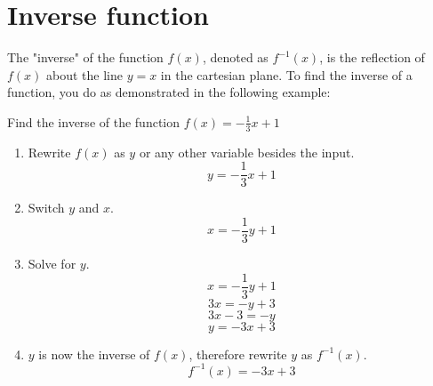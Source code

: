 \documentclass{article}
\begin{document}
\section{Inverse function}
The "inverse" of the function $f(x)$, denoted as $f^{-1}(x)$, is the reflection of $f(x)$ about the line $y=x$ in the cartesian plane. To find the inverse of a function, you do as demonstrated in the following example:

\begin{center}
    Find the inverse of the function $f(x)=-\frac{1}{3}x+1$
\end{center}

\begin{enumerate}
    \item Rewrite $f(x)$ as $y$ or any other variable besides the input.
    $$y=-\frac{1}{3}x+1$$
    \item Switch $y$ and $x$.
    $$x=-\frac{1}{3}y+1$$
    \item Solve for $y$.
    $$x=-\frac{1}{3}y+1$$
    $$3x=-y+3$$
    $$3x-3=-y$$
    $$y=-3x+3$$
    \item $y$ is now the inverse of $f(x)$, therefore rewrite $y$ as $f^{-1}(x)$.
    $$f^{-1}(x)=-3x+3$$
\end{enumerate}
\end{document}

